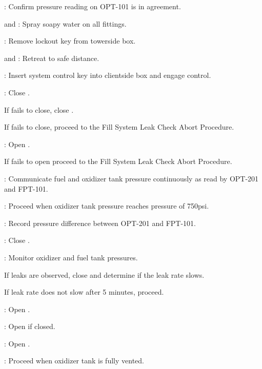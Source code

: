 \begin{checklist}
    \item \daq{}: Confirm pressure reading on OPT-101 is in agreement. 
    \item \primary{} and \secondary{}: Spray soapy water on all fittings.
    \item \secondary{}: Remove lockout key from towerside box.
    \item \primary{} and \secondary{}: Retreat to safe distance. 
    \item \rlcs{}: Insert system control key into clientside box and engage control.
    \item \rlcs{}: Close \vent{}.
    \begin{checklist}[label=$\bullet$]
        \item If \ventnum{} fails to close, close \oxiso.
        \item If \oxisonum{} fails to close, proceed to the Fill System Leak Check Abort Procedure.
    \end{checklist}
    \item \rlcs{}: Open \oxfill{}. 
    \begin{checklist}[label=$\bullet$]
        \item If \oxfillnum{} fails to open proceed to the Fill System Leak Check Abort Procedure.
    \end{checklist}
    \item \daq{}: Communicate fuel and oxidizer tank pressure continuously as read by OPT-201 and FPT-101. 
    \item \ops{}: Proceed when oxidizer tank pressure reaches pressure of 750psi.
    \item \ops{}: Record pressure difference between OPT-201 and FPT-101. 
    \item \rlcs{}: Close \oxfill{}.
    \item \daq{}: Monitor oxidizer and fuel tank pressures. 
     \begin{checklist}[label=$\bullet$]
        \item If leaks are observed, close \oxiso and determine if the leak rate slows. 
        \item If leak rate does not slow after 5 minutes, proceed.
    \end{checklist}
    \item \rlcs{}: Open \vent{}.
    \item \rlcs{}: Open \oxiso{} if closed. 
    \item \rlcs{}: Open \oxdrain{}.
    \item \ops{}: Proceed when oxidizer tank is fully vented. 

\end{checklist}

